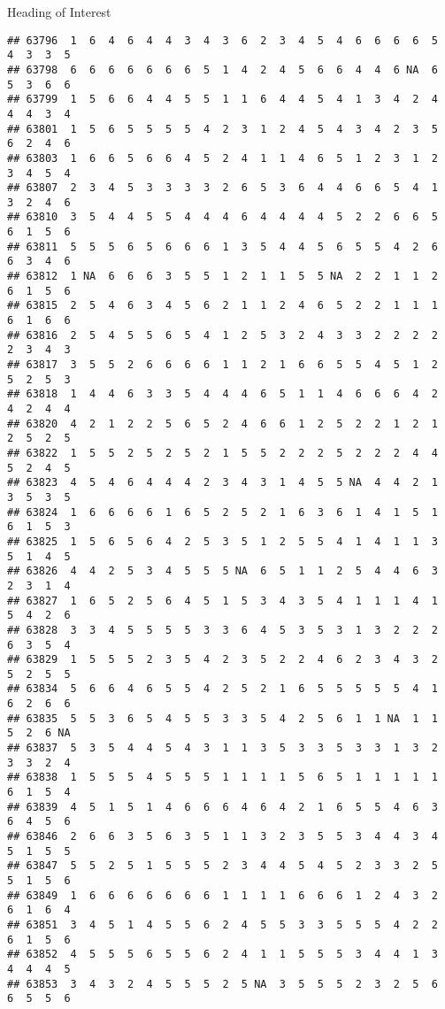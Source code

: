 \documentclass[
  ignorenonframetext,
]{beamer}
\begin{document}
\begin{frame}[fragile]{Heading of Interest}
\begin{verbatim}
## 63796  1  6  4  6  4  4  3  4  3  6  2  3  4  5  4  6  6  6  6  5  4  3  3  5
## 63798  6  6  6  6  6  6  6  5  1  4  2  4  5  6  6  4  4  6 NA  6  5  3  6  6
## 63799  1  5  6  6  4  4  5  5  1  1  6  4  4  5  4  1  3  4  2  4  4  4  3  4
## 63801  1  5  6  5  5  5  5  4  2  3  1  2  4  5  4  3  4  2  3  5  6  2  4  6
## 63803  1  6  6  5  6  6  4  5  2  4  1  1  4  6  5  1  2  3  1  2  3  4  5  4
## 63807  2  3  4  5  3  3  3  3  2  6  5  3  6  4  4  6  6  5  4  1  3  2  4  6
## 63810  3  5  4  4  5  5  4  4  4  6  4  4  4  4  5  2  2  6  6  5  6  1  5  6
## 63811  5  5  5  6  5  6  6  6  1  3  5  4  4  5  6  5  5  4  2  6  6  3  4  6
## 63812  1 NA  6  6  6  3  5  5  1  2  1  1  5  5 NA  2  2  1  1  2  6  1  5  6
## 63815  2  5  4  6  3  4  5  6  2  1  1  2  4  6  5  2  2  1  1  1  6  1  6  6
## 63816  2  5  4  5  5  6  5  4  1  2  5  3  2  4  3  3  2  2  2  2  2  3  4  3
## 63817  3  5  5  2  6  6  6  6  1  1  2  1  6  6  5  5  4  5  1  2  5  2  5  3
## 63818  1  4  4  6  3  3  5  4  4  4  6  5  1  1  4  6  6  6  4  2  4  2  4  4
## 63820  4  2  1  2  2  5  6  5  2  4  6  6  1  2  5  2  2  1  2  1  2  5  2  5
## 63822  1  5  5  2  5  2  5  2  1  5  5  2  2  2  5  2  2  2  4  4  5  2  4  5
## 63823  4  5  4  6  4  4  4  2  3  4  3  1  4  5  5 NA  4  4  2  1  3  5  3  5
## 63824  1  6  6  6  6  1  6  5  2  5  2  1  6  3  6  1  4  1  5  1  6  1  5  3
## 63825  1  5  6  5  6  4  2  5  3  5  1  2  5  5  4  1  4  1  1  3  5  1  4  5
## 63826  4  4  2  5  3  4  5  5  5 NA  6  5  1  1  2  5  4  4  6  3  2  3  1  4
## 63827  1  6  5  2  5  6  4  5  1  5  3  4  3  5  4  1  1  1  4  1  5  4  2  6
## 63828  3  3  4  5  5  5  5  3  3  6  4  5  3  5  3  1  3  2  2  2  6  3  5  4
## 63829  1  5  5  5  2  3  5  4  2  3  5  2  2  4  6  2  3  4  3  2  5  2  5  5
## 63834  5  6  6  4  6  5  5  4  2  5  2  1  6  5  5  5  5  5  4  1  6  2  6  6
## 63835  5  5  3  6  5  4  5  5  3  3  5  4  2  5  6  1  1 NA  1  1  5  2  6 NA
## 63837  5  3  5  4  4  5  4  3  1  1  3  5  3  3  5  3  3  1  3  2  3  3  2  4
## 63838  1  5  5  5  4  5  5  5  1  1  1  1  5  6  5  1  1  1  1  1  6  1  5  4
## 63839  4  5  1  5  1  4  6  6  6  4  6  4  2  1  6  5  5  4  6  3  6  4  5  6
## 63846  2  6  6  3  5  6  3  5  1  1  3  2  3  5  5  3  4  4  3  4  5  1  5  5
## 63847  5  5  2  5  1  5  5  5  2  3  4  4  5  4  5  2  3  3  2  5  5  1  5  6
## 63849  1  6  6  6  6  6  6  6  1  1  1  1  6  6  6  1  2  4  3  2  6  1  6  4
## 63851  3  4  5  1  4  5  5  6  2  4  5  5  3  3  5  5  5  4  2  2  6  1  5  6
## 63852  4  5  5  5  6  5  5  6  2  4  1  1  5  5  5  3  4  4  1  3  4  4  4  5
## 63853  3  4  3  2  4  5  5  5  2  5 NA  3  5  5  5  2  3  2  5  6  6  5  5  6

\end{verbatim}
\end{frame}
\end{document}
